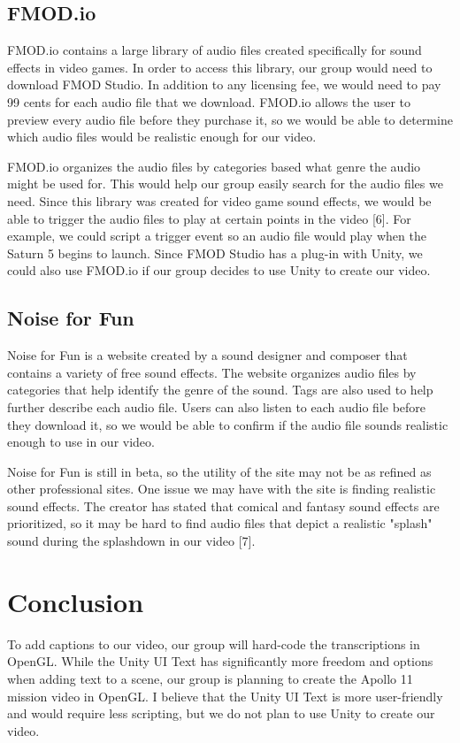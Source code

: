 \documentclass[onecolumn, draftclsnofoot,10pt, compsoc]{IEEEtran}
\begin{document}
\subsection{FMOD.io}
FMOD.io contains a large library of audio files created specifically for sound effects in video games. In order to access this library, our group would need to download FMOD Studio. In addition to any licensing fee, we would need to pay 99 cents for each audio file that we download. FMOD.io allows the user to preview every audio file before they purchase it, so we would be able to determine which audio files would be realistic enough for our video.

FMOD.io organizes the audio files by categories based what genre the audio might be used for. This would help our group easily search for the audio files we need. Since this library was created for video game sound effects, we would be able to trigger the audio files to play at certain points in the video [6]. For example, we could script a trigger event so an audio file would play when the Saturn 5 begins to launch. Since FMOD Studio has a plug-in with Unity, we could also use FMOD.io if our group decides to use Unity to create our video.

\subsection{Noise for Fun}
Noise for Fun is a website created by a sound designer and composer that contains a variety of free sound effects. The website organizes audio files by categories that help identify the genre of the sound. Tags are also used to help further describe each audio file. Users can also listen to each audio file before they download it, so we would be able to confirm if the audio file sounds realistic enough to use in our video.

Noise for Fun is still in beta, so the utility of the site may not be as refined as other professional sites. One issue we may have with the site is finding realistic sound effects. The creator has stated that comical and fantasy sound effects are prioritized, so it may be hard to find audio files that depict a realistic "splash" sound during the splashdown in our video [7].

\section{Conclusion}
To add captions to our video, our group will hard-code the transcriptions in OpenGL. While the Unity UI Text has significantly more freedom and options when adding text to a scene, our group is planning to create the Apollo 11 mission video in OpenGL. I believe that the Unity UI Text is more user-friendly and would require less scripting, but we do not plan to use Unity to create our video.
\end{document}
